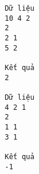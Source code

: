 \begin{verbatim}
Dữ liệu
10 4 2
2
2 1
5 2	

Kết quả
2

Dữ liệu
4 2 1
2
1 1
3 1	

Kết quả
-1
\end{verbatim}